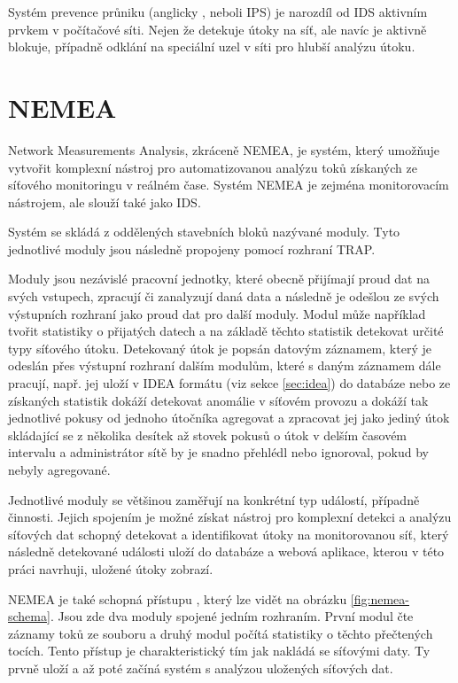 Systém prevence průniku (anglicky , neboli IPS)\cite{idsips} je narozdíl od IDS aktivním prvkem v počítačové síti. Nejen že detekuje útoky na síť, ale navíc je aktivně blokuje, případně odklání na speciální uzel v síti pro hlubší analýzu útoku.

\section{NEMEA}

Network Measurements Analysis, zkráceně NEMEA, je systém, který umožňuje vytvořit komplexní nástroj pro automatizovanou analýzu toků získaných ze síťového monitoringu v reálném čase. Systém NEMEA je zejména monitorovacím nástrojem, ale slouží také jako IDS.

Systém se skládá z oddělených stavebních bloků nazývané moduly. Tyto jednotlivé moduly jsou následně propojeny pomocí rozhraní TRAP.

Moduly jsou nezávislé pracovní jednotky, které obecně přijímají proud dat na svých vstupech, zpracují či zanalyzují daná data a následně je odešlou ze svých výstupních rozhraní jako proud dat pro další moduly. Modul může například tvořit statistiky o přijatých datech a na základě těchto statistik detekovat určité typy síťového útoku. Detekovaný útok je popsán datovým záznamem, který je odeslán přes výstupní rozhraní dalším modulům, které s daným záznamem dále pracují, např. jej uloží v IDEA formátu (viz sekce \ref{sec:idea}) do databáze nebo ze získaných statistik dokáží detekovat anomálie v síťovém provozu a dokáží tak jednotlivé pokusy od jednoho útočníka agregovat a zpracovat jej jako jediný útok skládající se z několika desítek až stovek pokusů o útok v delším časovém intervalu a administrátor sítě by je snadno přehlédl nebo ignoroval, pokud by nebyly agregované.

Jednotlivé moduly se většinou zaměřují na konkrétní typ událostí, případně činnosti. Jejich spojením je možné získat nástroj pro komplexní detekci a analýzu síťových dat schopný detekovat a identifikovat útoky na monitorovanou síť, který následně detekované události uloží do databáze a webová aplikace, kterou v této práci navrhuji, uložené útoky zobrazí.

NEMEA je také schopná přístupu , který lze vidět na obrázku \ref{fig:nemea-schema}. Jsou zde dva moduly spojené jedním rozhraním. První modul čte záznamy toků ze souboru a druhý modul počítá statistiky o těchto přečtených tocích. Tento přístup je charakteristický tím jak nakládá se síťovými daty. Ty prvně uloží a až poté začíná systém s analýzou uložených síťových dat. 

